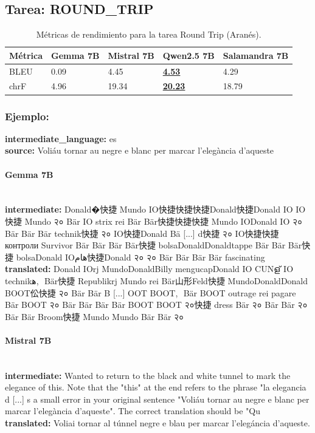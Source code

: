 \subsection{Tarea: ROUND\_TRIP}\label{tarea-round_trip}
\begin{longtable}[]{@{}lllll@{}}
\toprule\noalign{}
Métrica & Gemma 7B & Mistral 7B & Qwen2.5 7B & Salamandra 7B \\
\midrule\noalign{}
\endhead
\bottomrule\noalign{}
\caption{Métricas de rendimiento para la tarea Round Trip (Aranés).}
\label{tab:metricas_round_trip_Aranés}
\endlastfoot
BLEU & 0.09 & 4.45 & \textbf{\underline{4.53}} & 4.29 \\
chrF & 4.96 & 19.34 & \textbf{\underline{20.23}} & 18.79 \\
\end{longtable}

\subsubsection{Ejemplo:}
\textbf{intermediate\_language:} es\\
\textbf{source:} Voliáu tornar au negre e blanc per marcar l’elegància d’aqueste

\paragraph{Gemma 7B}~\\
\textbf{intermediate:} Donald�快捷 Mundo IO快捷快捷快捷Donald快捷Donald IO IO快捷 Mundo २० Bär IO strix rei Bär Bär快捷快捷快捷 Mundo IODonald IO २० Bär Bär Bär technik快捷 २० IO快捷Donald Bä [...] d快捷 २० IO快捷快捷 контроли Survivor Bär Bär Bär Bär快捷 bolsaDonaldDonaldtappe Bär Bär Bär快捷 bolsaDonald IOهام快捷Donald २० २० Bär Bär Bär Bär fascinating\\
\textbf{translated:} Donald IOrj MundoDonaldBilly mengucapDonald IO CUNള് IO technikﻫ,\,\ Bär快捷 Republikrj Mundo rei Bär山形Feld快捷 MundoDonaldDonald BOOT伀快捷 २० Bär Bär B [...] OOT BOOT,\,\ Bär BOOT outrage rei pagare Bär BOOT २० Bär Bär Bär Bär BOOT BOOT २०快捷 dress Bär २० Bär Bär २० Bär Bär Broom快捷 Mundo Mundo Bär Bär २०

\paragraph{Mistral 7B}~\\
\textbf{intermediate:} Wanted to return to the black and white tunnel to mark the elegance of this.  Note that the "this" at the end refers to the phrase "la elegancia d [...] s a small error in your original sentence "Voliáu tornar au negre e blanc per marcar l’elegància d’aqueste". The correct translation should be "Qu\\
\textbf{translated:} Voliai tornar al túnnel negre e blau per marcar l’elegáncia d’aqueste.

